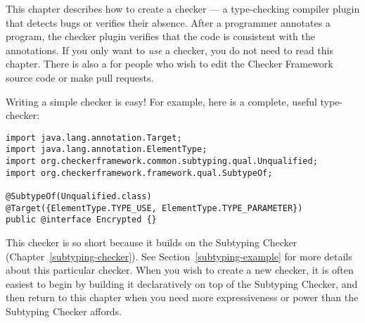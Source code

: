 \htmlhr
{}
\label{writing-a-checker} %

\newcommand{\TreeAPIBase}{https://docs.oracle.com/javase/8/docs/jdk/api/javac/tree/com/sun/source}
\newcommand{\refTreeclass}[2]{\href{\TreeAPIBase{}/#1/#2.html?is-external=true}{\<#2>}}
\newcommand{\ModelAPIBase}{https://docs.oracle.com/javase/8/docs/api/javax/lang/model}
\newcommand{\refModelclass}[2]{\href{\ModelAPIBase{}/#1/#2.html?is-external=true}{\<#2>}}

This chapter describes how to create a checker
--- a type-checking compiler plugin that detects bugs or verifies their
absence.  After a programmer annotates a program,
the checker plugin verifies that the code is consistent
with the annotations.
If you only want to \emph{use} a checker, you do not need to read this
chapter.
There is also a
 for people who wish to edit the Checker Framework source code or
make pull requests.


Writing a simple checker is easy!  For example, here is a complete, useful
type-checker:

\begin{Verbatim}
import java.lang.annotation.Target;
import java.lang.annotation.ElementType;
import org.checkerframework.common.subtyping.qual.Unqualified;
import org.checkerframework.framework.qual.SubtypeOf;

@SubtypeOf(Unqualified.class)
@Target({ElementType.TYPE_USE, ElementType.TYPE_PARAMETER})
public @interface Encrypted {}
\end{Verbatim}

This checker is so short because it builds on the Subtyping Checker
(Chapter~\ref{subtyping-checker}).
See Section~\ref{subtyping-example} for more details about this particular checker.
When you wish to create a new checker, it is often easiest to begin by
building it declaratively on top of the Subtyping Checker, and then return to
this chapter when you need more expressiveness or power than the Subtyping
Checker affords.

